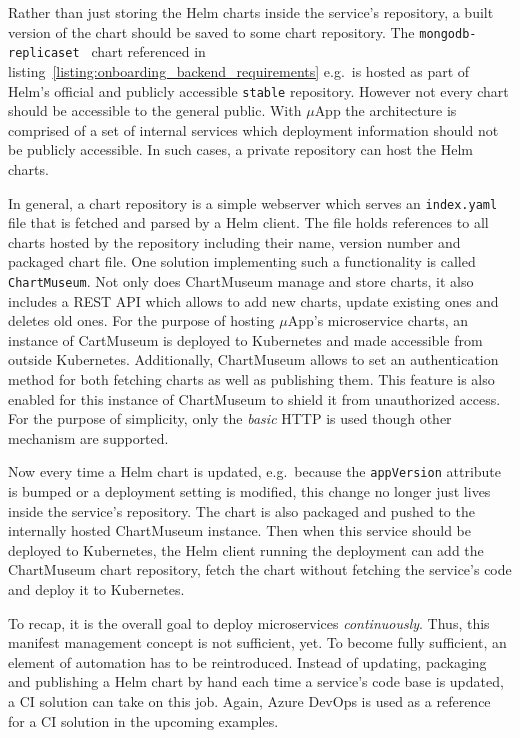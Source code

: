 Rather than just storing the Helm charts inside the service's repository, a
built version of the chart should be saved to some chart repository. The
\texttt{mongodb-replicaset } chart referenced in
listing~\ref{listing:onboarding_backend_requirements} e.g.\ is hosted as part
of Helm's official and publicly accessible \texttt{stable} repository. However
not every chart should be accessible to the general public.  With $\mu$App the
architecture is comprised of a set of internal services which deployment
information should not be publicly accessible. In such cases, a private
repository can host the Helm charts.

In general, a chart repository is a simple webserver which serves an
\texttt{index.yaml} file that is fetched and parsed by a Helm client. The file
holds references to all charts hosted by the repository including their name,
version number and packaged chart file. One solution implementing such a
functionality is called \texttt{ChartMuseum}. Not only does ChartMuseum manage
and store charts, it also includes a \ac{REST} \ac{API} which allows to add new
charts, update existing ones and deletes old ones. For the purpose of hosting
$\mu$App's microservice charts, an instance of CartMuseum is deployed to
Kubernetes and made accessible from outside Kubernetes. Additionally,
ChartMuseum allows to set an authentication method for both fetching charts as
well as publishing them. This feature is also enabled for this instance of
ChartMuseum to shield it from unauthorized access. For the purpose of
simplicity, only the \textit{basic} \ac{HTTP} is used though other mechanism
are supported.

Now every time a Helm chart is updated, e.g.\ because the \texttt{appVersion}
attribute is bumped or a deployment setting is modified, this change no longer
just lives inside the service's repository. The chart is also packaged and
pushed to the internally hosted ChartMuseum instance. Then when this service
should be deployed to Kubernetes, the Helm client running the deployment can
add the ChartMuseum chart repository, fetch the chart without fetching the
service's code and deploy it to Kubernetes.

To recap, it is the overall goal to deploy microservices \textit{continuously}.
Thus, this manifest management concept is not sufficient, yet. To become fully
sufficient, an element of automation has to be reintroduced. Instead of
updating, packaging and publishing a Helm chart by hand each time a service's
code base is updated, a \ac{CI} solution can take on this job. Again, Azure
DevOps is used as a reference for a \ac{CI} solution in the upcoming examples.

